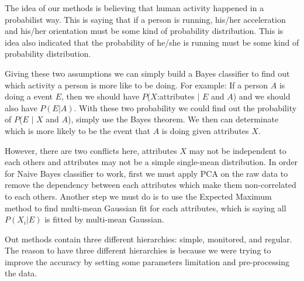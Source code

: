 \documentclass[a4paper, conference]{IEEEtran}
\begin{document}
The idea of our methods is believing that human activity happened in a probabilist way. This is saying that if a person is running, his/her acceleration and his/her orientation must be some kind of probability distribution. This is idea also indicated that the probability of he/she is running must be some kind  of probability distribution.

Giving these two assumptions we can simply build a Bayes classifier to find out which activity a person is more like to be doing. For example: If a person $A$ is doing a event $E$, then we should have $P$($X$:attributes $|$ $E$ and $A$) and we should also have $P(E | A)$. With these two probability we could find out the probability of $P$($E$ $|$ $X$ and $A$), simply use the Bayes theorem. We then can determinate which is more likely to be the event that $A$ is doing given attributes $X$. 

However, there are two conflicts here, attributes $X$ may not be independent to each others and attributes may not be a simple single-mean distribution.  In order for Naive Bayes classifier to work, first we must apply PCA on the raw data to remove the dependency between each attributes which make them non-correlated to each others. Another step we must do is to use the Expected Maximum method to find multi-mean Gaussian fit for each attributes, which is saying all $P(X_{i}|E)$ is fitted by multi-mean Gaussian.

Out methods contain three different hierarchies: simple, monitored, and regular. The reason to have three different hierarchies is because we were trying to improve the accuracy by setting some parameters limitation and pre-processing the data.
\end{document}
